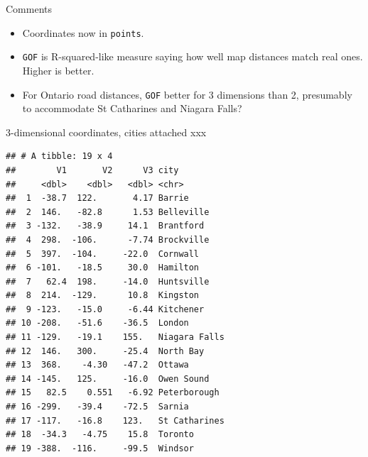 \documentclass[ignorenonframetext,]{beamer}
\newenvironment{Shaded}{\begin{snugshade}}{\end{snugshade}}
\newcommand{\DataTypeTok}[1]{\textcolor[rgb]{0.13,0.29,0.53}{#1}}
\newcommand{\FloatTok}[1]{\textcolor[rgb]{0.00,0.00,0.81}{#1}}
\newcommand{\KeywordTok}[1]{\textcolor[rgb]{0.13,0.29,0.53}{\textbf{#1}}}
\newcommand{\NormalTok}[1]{#1}
\newcommand{\OperatorTok}[1]{\textcolor[rgb]{0.81,0.36,0.00}{\textbf{#1}}}
\newcommand{\StringTok}[1]{\textcolor[rgb]{0.31,0.60,0.02}{#1}}
\begin{document}
\begin{frame}[fragile]{Comments}
\protect\hypertarget{comments-1}{}

\begin{itemize}
\item
  Coordinates now in \texttt{points}.
\item
  \texttt{GOF} is R-squared-like measure saying how well map distances
  match real ones. Higher is better.
\item
  For Ontario road distances, \texttt{GOF} better for 3 dimensions than
  2, presumably to accommodate St Catharines and Niagara Falls?
\end{itemize}

\end{frame}

\begin{frame}[fragile]{3-dimensional coordinates, cities attached xxx}
\protect\hypertarget{dimensional-coordinates-cities-attached-xxx}{}

\tiny

\begin{Shaded}
\end{Shaded}

\begin{verbatim}
## # A tibble: 19 x 4
##        V1       V2      V3 city         
##     <dbl>    <dbl>   <dbl> <chr>        
##  1  -38.7  122.       4.17 Barrie       
##  2  146.   -82.8      1.53 Belleville   
##  3 -132.   -38.9     14.1  Brantford    
##  4  298.  -106.      -7.74 Brockville   
##  5  397.  -104.     -22.0  Cornwall     
##  6 -101.   -18.5     30.0  Hamilton     
##  7   62.4  198.     -14.0  Huntsville   
##  8  214.  -129.      10.8  Kingston     
##  9 -123.   -15.0     -6.44 Kitchener    
## 10 -208.   -51.6    -36.5  London       
## 11 -129.   -19.1    155.   Niagara Falls
## 12  146.   300.     -25.4  North Bay    
## 13  368.    -4.30   -47.2  Ottawa       
## 14 -145.   125.     -16.0  Owen Sound   
## 15   82.5    0.551   -6.92 Peterborough 
## 16 -299.   -39.4    -72.5  Sarnia       
## 17 -117.   -16.8    123.   St Catharines
## 18  -34.3   -4.75    15.8  Toronto      
## 19 -388.  -116.     -99.5  Windsor
\end{verbatim}

\normalsize

\end{frame}
\end{document}
